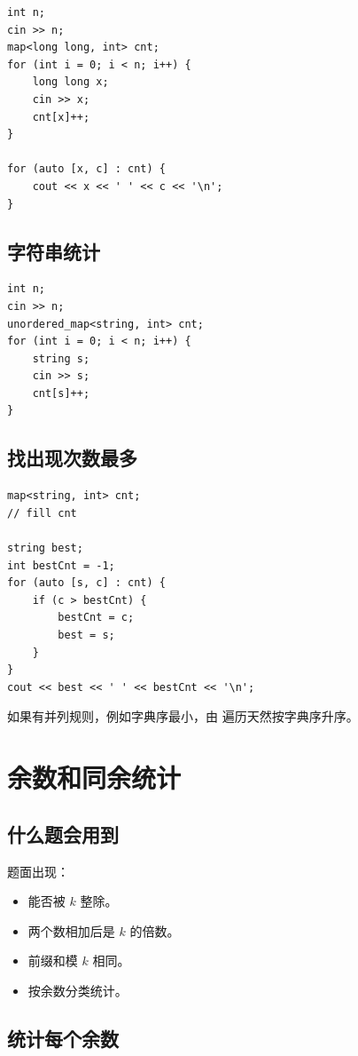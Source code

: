 \begin{lstlisting}
int n;
cin >> n;
map<long long, int> cnt;
for (int i = 0; i < n; i++) {
    long long x;
    cin >> x;
    cnt[x]++;
}

for (auto [x, c] : cnt) {
    cout << x << ' ' << c << '\n';
}
\end{lstlisting}

\subsection{字符串统计}

\begin{lstlisting}
int n;
cin >> n;
unordered_map<string, int> cnt;
for (int i = 0; i < n; i++) {
    string s;
    cin >> s;
    cnt[s]++;
}
\end{lstlisting}

\subsection{找出现次数最多}

\begin{lstlisting}
map<string, int> cnt;
// fill cnt

string best;
int bestCnt = -1;
for (auto [s, c] : cnt) {
    if (c > bestCnt) {
        bestCnt = c;
        best = s;
    }
}
cout << best << ' ' << bestCnt << '\n';
\end{lstlisting}

如果有并列规则，例如字典序最小，由  遍历天然按字典序升序。

\section{余数和同余统计}\label{sec:06-11}

\subsection{什么题会用到}

题面出现：

\begin{itemize}
  \item 能否被 $k$ 整除。
  \item 两个数相加后是 $k$ 的倍数。
  \item 前缀和模 $k$ 相同。
  \item 按余数分类统计。
\end{itemize}

\subsection{统计每个余数}

